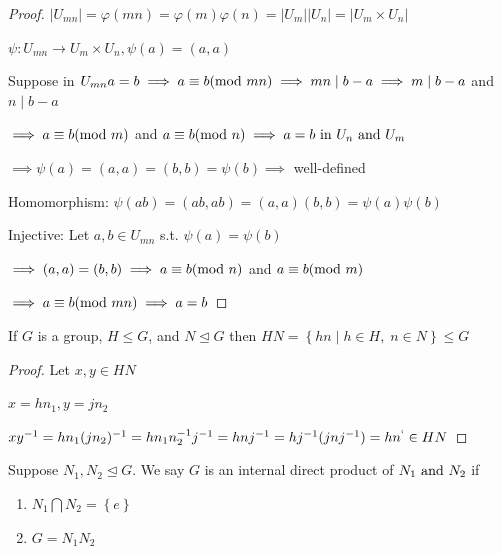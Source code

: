 \newpage
{}

\begin{proof}
    $|U_{mn}|=\varphi(mn)=\varphi(m)\varphi(n)=|U_m||U_n|=|U_{m}\times U_{n}|$

    $\psi: U_{mn} \rightarrow U_{m}\times U_{n}, \psi(a)=(a,a)$

    Suppose in $U_{mn} a=b\implies a\equiv b(\text{mod }mn) 
    \implies mn \mid b-a \implies m \mid b-a$ and $n\mid b-a$

    $\implies a\equiv b(\text{mod }m)$ and $a\equiv b(\text{mod }n)
    \implies a=b \text{ in } U_n \text{ and } U_m$

    $\implies \psi(a)=(a,a)=(b,b)=\psi(b) \implies$ well-defined

    Homomorphism: $\psi(ab)=(ab,ab)=(a,a)(b,b)=\psi(a)\psi(b)$

    Injective: Let $a,b \in U_{mn}$ s.t. $\psi(a)=\psi(b)$

    $\implies (a,a)=(b,b) \implies a\equiv b(\text{mod }n)$ and 
    $a\equiv b(\text{mod }m)$

    $\implies a\equiv b(\text{mod }mn) \implies a=b$
\end{proof}

\begin{proposition}
    If $G$ is a group, $H\leq G$, and $N \unlhd G$ then
    $HN=\left\{ hn \mid h\in H,\; n\in N \right\}\leq G$
\end{proposition}

\begin{proof}
    Let $x,y\in HN$

    $x=hn_1, y=jn_2$

    $xy^{-1}=hn_1(jn_2)^{-1}=hn_1n_2^{-1}j^{-1}=hnj^{-1}=hj^{-1}(jnj^{-1})=hn^`\in HN$
\end{proof}

\begin{definition}
    Suppose $N_1,N_2\unlhd G$. We say $G$ is an internal direct
    product of $N_1 \text{ and } N_2$ if
    \begin{enumerate}
        \item $N_1 \bigcap N_2 = \left\{ e \right\}$
        \item $G=N_1N_2$
    \end{enumerate}
\end{definition}

